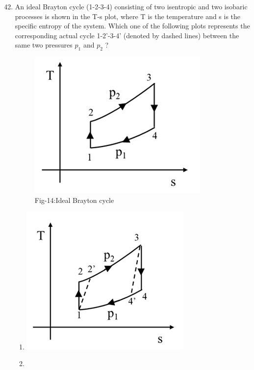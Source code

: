 \documentclass[journal]{IEEEtran}
\theoremstyle{remark}
\begin{document}
\begin{enumerate}[itemsep=1em]
\setcounter{enumi}{41}
\item An ideal Brayton cycle (1-2-3-4) consisting of two isentropic and two isobaric processes is shown in the T-s plot, where T is the temperature and s is the specific entropy of the system. Which one of the following plots represents the corresponding actual cycle 1-2'-3-4' (denoted by dashed lines) between the same two pressures $p_1$ and $p_2$ ? 
\begin{figure}[H]
    \centering
    \includegraphics[width=0.2\columnwidth]{figs/fig-14.jpeg}
    \caption*{Fig-14:Ideal Brayton cycle}
    \label{fig:14}
\end{figure}
\begin{multicols}{4}
\begin{enumerate}
    \item \begin{minipage}[t]{0.2\textwidth}
    \vspace{0pt}
        \includegraphics[width=\columnwidth]{figs/fig-15.jpeg}
        \label{fig:15}
    \end{minipage}
    \item \begin{minipage}[t]{0.2\textwidth}

\end{minipage}
\end{enumerate}
\end{multicols}
\end{enumerate}
\end{document}
